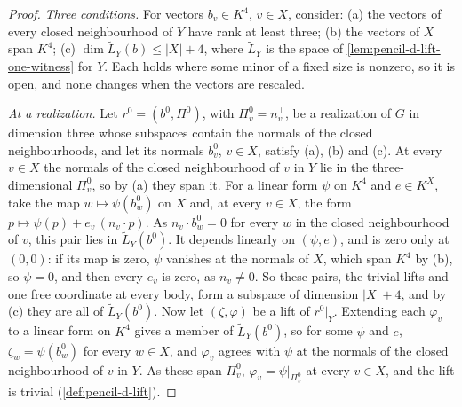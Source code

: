 \begin{proof}
  \leanok
  \emph{Three conditions.} For vectors $b_v \in K^4$, $v \in X$, consider:
  (a) the vectors of every closed neighbourhood of $Y$ have rank at least
  three; (b) the vectors of $X$ span $K^4$;
  (c) $\dim \widetilde L_Y(b) \le |X| + 4$, where $\widetilde L_Y$ is the
  space of \cref{lem:pencil-d-lift-one-witness} for $Y$. Each holds where
  some minor of a fixed size is nonzero, so it is open, and none changes
  when the vectors are rescaled.

  \emph{At a realization.} Let $r^0 = (b^0, \Pi^0)$, with
  $\Pi^0_v = n_v^{\perp}$, be a realization of $G$ in dimension three
  whose subspaces contain the normals of the closed neighbourhoods, and
  let its normals $b^0_v$, $v \in X$, satisfy (a), (b) and (c). At every
  $v \in X$ the normals of the closed neighbourhood of $v$ in $Y$ lie in
  the three-dimensional $\Pi^0_v$, so by (a) they span it. For a linear
  form $\psi$ on $K^4$ and $e \in K^X$, take the map
  $w \mapsto \psi(b^0_w)$ on $X$ and, at every $v \in X$, the form
  $p \mapsto \psi(p) + e_v\, (n_v \cdot p)$. As $n_v \cdot b^0_w = 0$ for
  every $w$ in the closed neighbourhood of $v$, this pair lies in
  $\widetilde L_Y(b^0)$. It depends linearly on $(\psi, e)$, and is zero
  only at $(0, 0)$: if its map is zero, $\psi$ vanishes at the normals of
  $X$, which span $K^4$ by (b), so $\psi = 0$, and then every $e_v$ is
  zero, as $n_v \ne 0$. So these pairs, the trivial lifts and one free
  coordinate at every body, form a subspace of dimension $|X| + 4$, and
  by (c) they are all of $\widetilde L_Y(b^0)$. Now let
  $(\zeta, \varphi)$ be a lift of $r^0|_Y$. Extending each $\varphi_v$ to
  a linear form on $K^4$ gives a member of $\widetilde L_Y(b^0)$, so for
  some $\psi$ and $e$, $\zeta_w = \psi(b^0_w)$ for every $w \in X$, and
  $\varphi_v$ agrees with $\psi$ at the normals of the closed
  neighbourhood of $v$ in $Y$. As these span $\Pi^0_v$,
  $\varphi_v = \psi|_{\Pi^0_v}$ at every $v \in X$, and the lift is
  trivial (\cref{def:pencil-d-lift}).


\end{proof}

